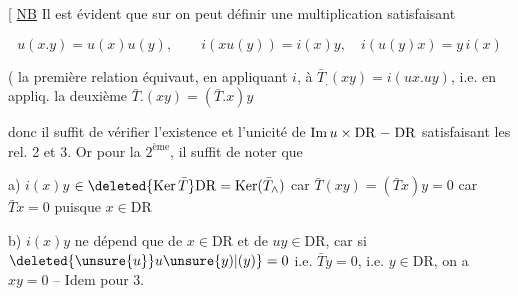 [ \uline{NB} Il est évident que sur  on peut définir  une multiplication   satisfaisant

\[
u(x.y)=u(x)u(y),\qquad i(xu(y))=i(x)y,\quad i(u(y)x)=y\,i(x)
\]

( la première relation équivaut, en appliquant $i$, à $\bar T_.(xy)=i(ux.uy)$, i.e. en appliq. la deuxième $\bar T.(xy)=(\bar T.x)y$

donc il suffit de vérifier l'existence et l'unicité de $\operatorname{Im}u\times\mathrm{DR}\relbar\mathrm{DR}$  satisfaisant les rel. 2 et 3. Or pour la $2^{\mathrm{ème}}$, il suffit de noter que

a) $i(x)y$ $\in\deleted{\operatorname{Ker}\bar T}\mathrm{DR}=\operatorname{Ker}(\bar T_\wedge)$ car $\bar T(xy)=(\bar T x)y=0$ car $\bar T x=0$ puisque $x\in\mathrm{DR}$

b) $i(x)y$ ne dépend que de $x\in\mathrm{DR}$ et de $uy\in\mathrm{DR}$, car si $\deleted{\unsure{u}}u\unsure{y)|(y)}=0$ i.e. $\bar Ty=0$, i.e. $y\in\mathrm{DR}$, on a $xy=0$ -- Idem pour 3.

